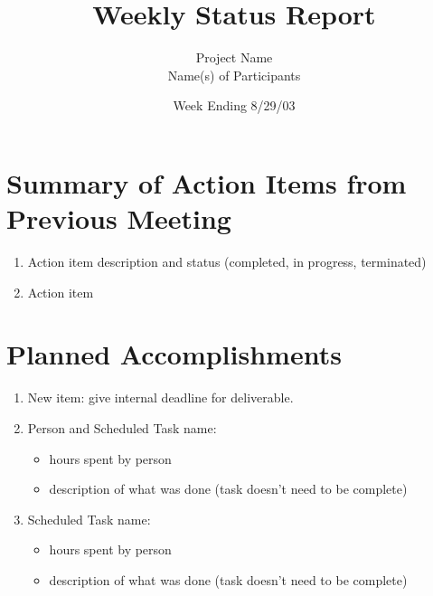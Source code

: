 \documentclass[11pt]{article}
\begin{document}
\title{Weekly Status Report}
\author{Project Name \\
Name(s) of Participants \\
\date{Week Ending 8/29/03}
}
\maketitle
%
%
\section{Summary of Action Items from Previous Meeting}
\begin{enumerate}
\item Action item description and status (completed, in progress, terminated) 
\item Action item
\end{enumerate}
%
%
\section{Planned Accomplishments}
\begin{enumerate}
\item New item: give internal deadline for deliverable.
\item Person and Scheduled Task name:
   \begin{itemize}
      \item hours spent by person
      \item description of what was done (task doesn't need to be complete)
   \end{itemize}
\item Scheduled Task name:
   \begin{itemize}
      \item hours spent by person
      \item description of what was done (task doesn't need to be complete)
   \end{itemize}
\end{enumerate}
\end{document}
